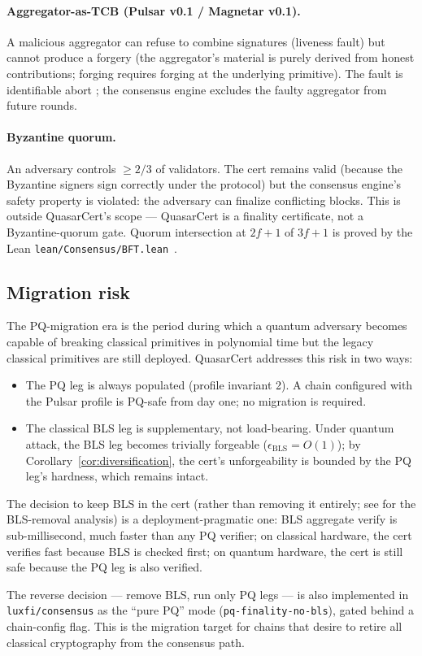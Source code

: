 \paragraph{Aggregator-as-TCB (Pulsar v0.1 / Magnetar v0.1).} A
malicious aggregator can refuse to combine signatures (liveness
fault) but cannot produce a forgery (the aggregator's material is
purely derived from honest contributions; forging requires forging
at the underlying primitive). The fault is identifiable abort
\cite{cggmp21}; the consensus engine excludes the faulty aggregator
from future rounds.

\paragraph{Byzantine quorum.} An adversary controls $\geq 2/3$ of
validators. The cert remains valid (because the Byzantine signers
sign correctly under the protocol) but the consensus engine's
safety property is violated: the adversary can finalize conflicting
blocks. This is outside QuasarCert's scope --- QuasarCert is a
finality certificate, not a Byzantine-quorum gate. Quorum
intersection at $2f + 1$ of $3f + 1$ is proved by the Lean
\texttt{lean/Consensus/BFT.lean}~\cite{quasarcertsoundness}.

\subsection{Migration risk}

The PQ-migration era is the period during which a quantum adversary
becomes capable of breaking classical primitives in polynomial time
but the legacy classical primitives are still deployed. QuasarCert
addresses this risk in two ways:

\begin{itemize}[leftmargin=2em,nosep]
\item The PQ leg is always populated (profile invariant 2). A
      chain configured with the Pulsar profile is PQ-safe from day
      one; no migration is required.
\item The classical BLS leg is supplementary, not load-bearing.
      Under quantum attack, the BLS leg becomes trivially forgeable
      ($\epsilon_{\mathrm{BLS}} = O(1)$); by
      Corollary~\ref{cor:diversification}, the cert's
      unforgeability is bounded by the PQ leg's hardness, which
      remains intact.
\end{itemize}

The decision to keep BLS in the cert (rather than removing it
entirely; see \cite{pqfinalitynobls} for the BLS-removal analysis)
is a deployment-pragmatic one: BLS aggregate verify is
sub-millisecond, much faster than any PQ verifier; on classical
hardware, the cert verifies fast because BLS is checked first; on
quantum hardware, the cert is still safe because the PQ leg is
also verified.

The reverse decision --- remove BLS, run only PQ legs --- is also
implemented in \texttt{luxfi/consensus} as the ``pure PQ'' mode
(\texttt{pq-finality-no-bls}), gated behind a chain-config flag.
This is the migration target for chains that desire to retire all
classical cryptography from the consensus path.
